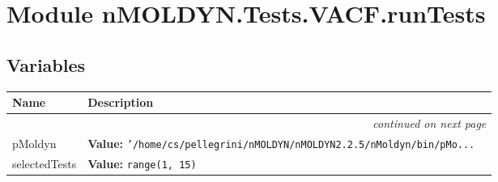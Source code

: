 %
%
%


\section{Module nMOLDYN.Tests.VACF.runTests}

    \label{nMOLDYN:Tests:VACF:runTests}


  \subsection{Variables}

    \vspace{-1cm}
\hspace{\varindent}\begin{longtable}{|p{\varnamewidth}|p{\vardescrwidth}|l}
\cline{1-2}
\cline{1-2} \centering \textbf{Name} & \centering \textbf{Description}& \\
\cline{1-2}
\endhead\cline{1-2}\multicolumn{3}{r}{\small\textit{continued on next page}}\\\endfoot\cline{1-2}
\endlastfoot\raggedright p\-M\-o\-l\-d\-y\-n\- & \raggedright \textbf{Value:} 
{\tt '/home/cs/pellegrini/nMOLDYN/nMOLDYN2.2.5/nMoldyn/bin/pMo\texttt{...}}&\\
\cline{1-2}
\raggedright s\-e\-l\-e\-c\-t\-e\-d\-T\-e\-s\-t\-s\- & \raggedright \textbf{Value:} 
{\tt range(1, 15)}&\\
\cline{1-2}
\end{longtable}

